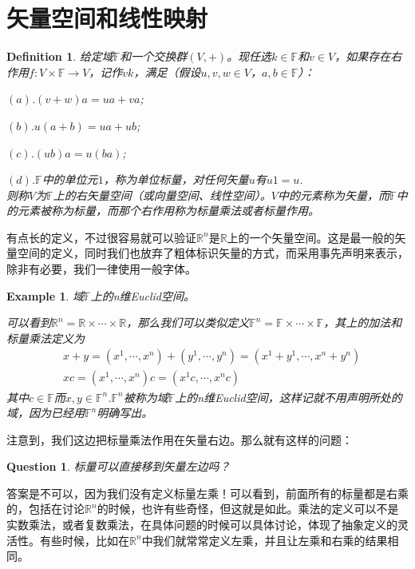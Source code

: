 \documentclass[11pt,a4paper,openany]{book}%
\theoremstyle{plain}%
\newtheorem{que}{Question}[chapter]%
\newtheorem{defi}{Definition}[chapter]%
\newtheorem{exa}{Example}[chapter]%
\begin{document}
\section{矢量空间和线性映射}
\begin{defi}
给定域$\mathbb{F}$和一个交换群$(V,+)$。现任选$k \in \mathbb{F}$和$v \in V$，如果存在右作用$f:V\times \mathbb{F}\rightarrow V$，记作$vk$，满足（假设$u,v,w \in V$，$a,b \in \mathbb{F}$）：

$(a)$.$(v+w)a=ua+va$;

$(b)$.$u(a+b)=ua+ub$;

$(c)$.$(ub)a=u(ba)$;

$(d)$.$\mathbb{F}$中的单位元$1$，称为单位标量，对任何矢量$u$有$u1=u$.\\
则称$V$为$\mathbb{F}$上的右矢量空间（或向量空间、线性空间）。$V$中的元素称为矢量，而$\mathbb{F}$中的元素被称为标量，而那个右作用称为标量乘法或者标量作用。
\end{defi}
有点长的定义，不过很容易就可以验证$\mathbb{R}^{n}$是$\mathbb{R}$上的一个矢量空间。这是最一般的矢量空间的定义，同时我们也放弃了粗体标识矢量的方式，而采用事先声明来表示，除非有必要，我们一律使用一般字体。
\begin{exa}
域$\mathbb{F}$上的n维{\rm Euclid}空间。

可以看到$\mathbb{R}^{n}=\mathbb{R}\times \cdots \times \mathbb{R}$，那么我们可以类似定义$\mathbb{F}^{n}=\mathbb{F}\times \cdots \times \mathbb{F}$，其上的加法和标量乘法定义为
\begin{equation*}
\begin{split}
&x+y=(x^{1},\cdots,x^{n})+(y^{1},\cdots,y^{n})=(x^{1}+y^1,\cdots,x^{n}+y^n)\\
&xc=(x^{1},\cdots,x^{n})c=(x^{1}c,\cdots,x^{n}c)
\end{split}
\end{equation*}
其中$c\in \mathbb{F}$而$x,y\in \mathbb{F}^{n}$.$\mathbb{F}^{n}$被称为域$\mathbb{F}$上的n维{\rm Euclid}空间，这样记就不用声明所处的域，因为已经用$\mathbb{F}^{n}$明确写出。
\end{exa}
\indent 注意到，我们这边把标量乘法作用在矢量右边。那么就有这样的问题：
\begin{que}
标量可以直接移到矢量左边吗？
\end{que}

\indent 答案是不可以，因为我们没有定义标量左乘！可以看到，前面所有的标量都是右乘的，包括在讨论$\mathbb{R}^{n}$的时候，也许有些奇怪，但这就是如此。乘法的定义可以不是实数乘法，或者复数乘法，在具体问题的时候可以具体讨论，体现了抽象定义的灵活性。有些时候，比如在$\mathbb{R}^{n}$中我们就常常定义左乘，并且让左乘和右乘的结果相同。
\end{document}
